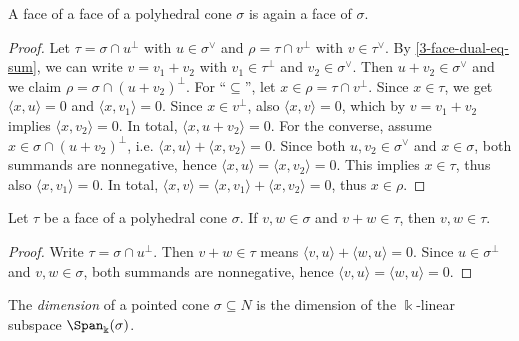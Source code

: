 \begin{lemma}
  \label{3-face-face}
  A face of a face of a polyhedral cone \( \sigma \) is again a face
  of \( \sigma \).
\end{lemma}
\begin{proof}
  Let \( \tau = \sigma \cap u^{\perp} \) with \( u \in \sigma^{\vee}
  \) and \( \rho = \tau \cap v^{\perp} \) with \( v \in \tau^{\vee}
  \). By \ref{3-face-dual-eq-sum}, we can write \( v = v_1 + v_2 \)
  with \( v_1 \in \tau^{\perp} \) and \( v_2 \in \sigma^{\vee} \).
  Then \( u + v_2 \in \sigma^{\vee} \) and we claim \( \rho = \sigma
  \cap (u + v_2)^{\perp} \). For ``\( \subseteq \)'', let \( x \in
  \rho = \tau \cap v^{\perp} \). Since \( x \in \tau \), we get \(
  \langle x, u \rangle = 0 \) and \( \langle x, v_1 \rangle = 0 \).
  Since \( x \in v^{\perp} \), also \( \langle x, v \rangle = 0 \),
  which by \( v = v_1 + v_2 \) implies \( \langle x, v_2 \rangle = 0
  \). In total, \( \langle x, u + v_2 \rangle = 0 \). For the
  converse, assume \( x \in \sigma \cap (u + v_2)^{\perp} \), i.e. \(
  \langle x, u \rangle + \langle x, v_2 \rangle = 0 \). Since both \(
  u, v_2 \in \sigma^{\vee} \) and \( x \in \sigma \), both summands
  are nonnegative, hence \( \langle x, u \rangle = \langle x, v_2
  \rangle = 0 \). This implies \( x \in \tau \), thus also \( \langle
  x, v_1 \rangle = 0 \). In total, \( \langle x, v \rangle = \langle
  x, v_1 \rangle + \langle x, v_2 \rangle = 0 \), thus \( x \in \rho
  \).
\end{proof}


\begin{lemma}
  \label{3-face-mem-of-add}
  Let \( \tau \) be a face of a polyhedral cone \( \sigma \). If \( v,
  w \in \sigma \) and \( v + w \in \tau \), then \( v, w \in \tau \).
\end{lemma}
\begin{proof}
  \uses{}
  Write \( \tau = \sigma \cap u^{\perp} \). Then \( v + w \in \tau \)
  means \( \langle v, u \rangle + \langle w, u \rangle = 0 \). Since
  \( u \in \sigma^{\perp} \) and \( v, w \in \sigma \), both summands
  are nonnegative, hence \( \langle v, u \rangle = \langle w, u
  \rangle = 0 \).
\end{proof}

\begin{definition}
  \label{3-pointed-cone-dimension}
  The \emph{dimension} of a pointed cone \( \sigma \subseteq N \) is
  the dimension of the \( \Bbbk \)-linear subspace \(
  \Span_{\Bbbk}(\sigma) \).
\end{definition}

